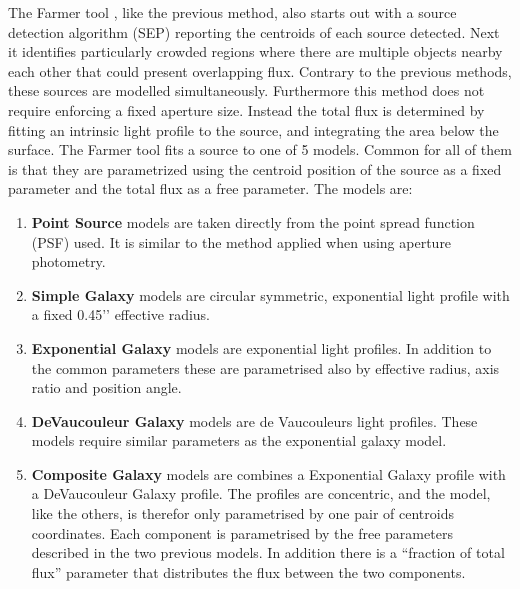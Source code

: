 The Farmer tool \cite{Weaver_2020}, like the previous method, also starts out with a source detection algorithm (SEP) reporting the centroids of each source detected. Next it identifies particularly crowded regions where there are multiple objects nearby each other that could present overlapping flux. Contrary to the previous methods, these sources are modelled simultaneously. Furthermore this method does not require enforcing a fixed aperture size. Instead the total flux is determined by fitting an intrinsic light profile to the source, and integrating the area below the surface. The Farmer tool fits a source to one of 5 models. Common for all of them is that they are parametrized using the centroid position of the source as a fixed parameter and the total flux as a free parameter. The models are:
\begin{enumerate}
    \item \textbf{Point Source} models are taken directly from the point spread function (PSF) used. It is similar to the method applied when using aperture photometry.
    \item \textbf{Simple Galaxy} models are circular symmetric, exponential light profile with a fixed 0.45’’ effective radius.
    \item \textbf{Exponential Galaxy} models are exponential light profiles. In addition to the common parameters these are parametrised also by effective radius, axis ratio and position angle.
    \item \textbf{DeVaucouleur Galaxy} models are de Vaucouleurs light profiles. These models require similar parameters as the exponential galaxy model.
    \item \textbf{Composite Galaxy} models are combines a Exponential Galaxy profile with a DeVaucouleur Galaxy profile. The profiles are concentric, and the model, like the others, is therefor only parametrised by one pair of centroids coordinates. Each component is parametrised by the free parameters described in the two previous models. In addition there is a “fraction of total flux” parameter that distributes the flux between the two components.
\end{enumerate}


